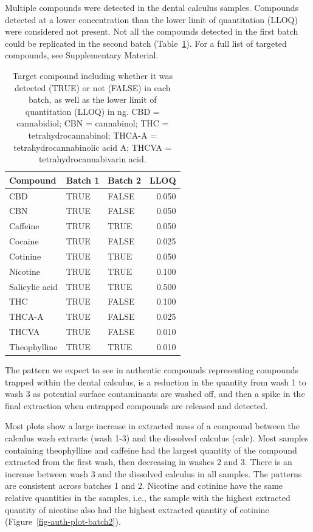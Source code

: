 \documentclass[
  b5paper,
]{book}
\begin{document}
Multiple compounds were detected in the dental calculus samples.
Compounds detected at a lower concentration than the lower limit of
quantitation (LLOQ) were considered not present. Not all the compounds
detected in the first batch could be replicated in the second batch
(Table~\ref{tbl-compound-detect}). For a full list of targeted
compounds, see Supplementary Material.

\begin{longtable}[]{@{}lllr@{}}

\caption{\label{tbl-compound-detect}Target compound including whether it
was detected (TRUE) or not (FALSE) in each batch, as well as the lower
limit of quantitation (LLOQ) in ng. CBD = cannabidiol; CBN = cannabinol;
THC = tetrahydrocannabinol; THCA-A = tetrahydrocannabinolic acid A;
THCVA = tetrahydrocannabivarin acid.}

\tabularnewline

\toprule\noalign{}
Compound & Batch 1 & Batch 2 & LLOQ \\
\midrule\noalign{}
\endhead
\bottomrule\noalign{}
\endlastfoot
CBD & TRUE & FALSE & 0.050 \\
CBN & TRUE & FALSE & 0.050 \\
Caffeine & TRUE & TRUE & 0.050 \\
Cocaine & TRUE & FALSE & 0.025 \\
Cotinine & TRUE & TRUE & 0.050 \\
Nicotine & TRUE & TRUE & 0.100 \\
Salicylic acid & TRUE & TRUE & 0.500 \\
THC & TRUE & FALSE & 0.100 \\
THCA-A & TRUE & FALSE & 0.025 \\
THCVA & TRUE & FALSE & 0.010 \\
Theophylline & TRUE & TRUE & 0.010 \\

\end{longtable}

The pattern we expect to see in authentic compounds representing
compounds trapped within the dental calculus, is a reduction in the
quantity from wash 1 to wash 3 as potential surface contaminants are
washed off, and then a spike in the final extraction when entrapped
compounds are released and detected.

Most plots show a large increase in extracted mass of a compound between
the calculus wash extracts (wash 1-3) and the dissolved calculus (calc).
Most samples containing theophylline and caffeine had the largest
quantity of the compound extracted from the first wash, then decreasing
in washes 2 and 3. There is an increase between wash 3 and the dissolved
calculus in all samples. The patterns are consistent across batches 1
and 2. Nicotine and cotinine have the same relative quantities in the
samples, i.e., the sample with the highest extracted quantity of
nicotine also had the highest extracted quantity of cotinine
(Figure~\ref{fig-auth-plot-batch2}).
\end{document}
